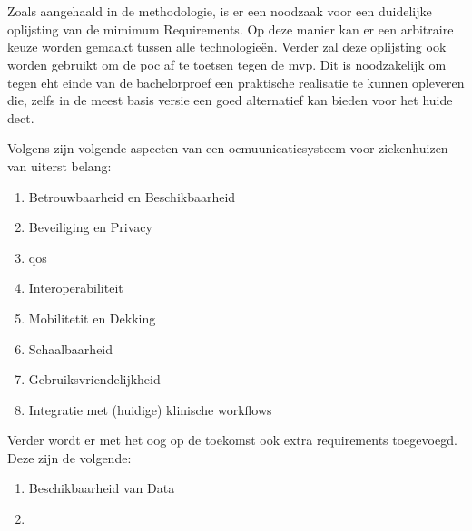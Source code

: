 \chapter{}%
\label{ch:minreq}

Zoals aangehaald in de methodologie, is er een noodzaak voor een duidelijke oplijsting van de mimimum Requirements. Op deze manier kan er een arbitraire keuze worden gemaakt tussen alle technologieën. Verder zal deze oplijsting ook worden gebruikt om de \acrshort{poc} af te toetsen tegen de \acrshort{mvp}. Dit is noodzakelijk om tegen eht einde van de bachelorproef een praktische realisatie te kunnen opleveren die, zelfs in de meest basis versie een goed alternatief kan bieden voor het huide \acrshort{dect}.

Volgens \textcite{Coiera2006} zijn volgende aspecten van een ocmuunicatiesysteem voor ziekenhuizen van uiterst belang:

\begin{enumerate}
    \item Betrouwbaarheid en Beschikbaarheid
    \item Beveiliging en Privacy
    \item \acrfull{qos}
    \item Interoperabiliteit
    \item Mobilitetit en Dekking
    \item Schaalbaarheid
    \item Gebruiksvriendelijkheid
    \item Integratie met (huidige) klinische workflows 
\end{enumerate}

Verder wordt er met het oog op de toekomst ook extra requirements toegevoegd. Deze zijn de volgende:

\begin{enumerate}
    \item Beschikbaarheid van Data
    \item 
\end{enumerate}

\section{}

\section{}


